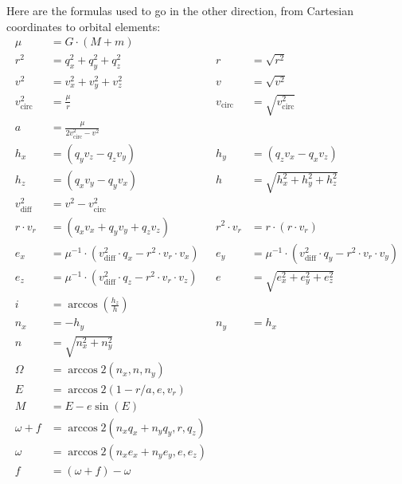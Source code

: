 Here are the formulas used to go in the other direction, from Cartesian coordinates to orbital elements:
\begin{align*}
\mu &= G \cdot (M + m) \\
r^2 &= q_x^2 + q_y^2 + q_z^2 & r &= \sqrt{r^2} \\
v^2 &= v_x^2 + v_y^2 + v_z^2 & v &= \sqrt{v^2} \\
v^2_{\mathrm{circ}} &= \frac{\mu}{r} & v_{\mathrm{circ}} &= \sqrt{v^2_{\mathrm{circ}}} \\
a &= \frac{\mu}{2 v_{\mathrm{circ}}^2 - v^2} \\
h_x &= (q_y v_z - q_z v_y) & h_y &= (q_z v_x - q_x v_z) \\
h_z &= (q_x v_y - q_y v_x) & h &= \sqrt{h_x^2 + h_y^2 + h_z^2 } \\
v^2_{\mathrm{diff}} &= v^2 - v^2_{\mathrm{circ}} \\
r \cdot v_r &= (q_x v_x + q_y v_y + q_z v_z) & r^2 \cdot v_r &= r \cdot (r \cdot v_r) \\
e_x &= \mu^{-1} \cdot (v^2_{\mathrm{diff}} \cdot q_x - r^2 \cdot v_r \cdot v_x) & e_y &= \mu^{-1} \cdot (v^2_{\mathrm{diff}} \cdot q_y - r^2 \cdot v_r \cdot v_y) \\
e_z &= \mu^{-1} \cdot (v^2_{\mathrm{diff}} \cdot q_z - r^2 \cdot v_r \cdot v_z) & e &= \sqrt{ e_x^2 + e_y^2 + e_z^2} \\
i &= \arccos \left( \frac{h_z}{h} \right) \\
n_x &= -h_y & n_y &= h_x \\
n &= \sqrt{n_x^2 + n_y^2} \\
 \Omega &= \arccos2(n_x, n , n_y) \\
E &= \arccos2(1 - r / a, e, v_r) \\
M &= E- e \sin(E) \\
\omega + f &= \arccos2(n_x q_x + n_y q_y, r, q_z) \\
\omega &= \arccos2(n_x  e_x + n_y e_y, e, e_z) \\
f &= (\omega + f) - \omega
\end{align*}

